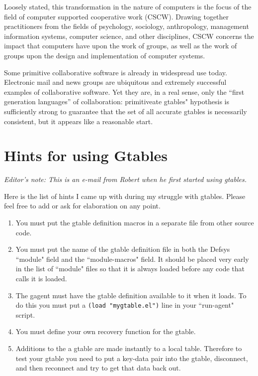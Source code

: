 Loosely stated, this transformation in the nature of computers is the focus
of the field of computer supported cooperative work (CSCW). Drawing
together practitioners from the fields of psychology, sociology,
anthropology, management information systems, computer science, and other
disciplines, CSCW concerns the impact that computers have upon the work of
groups, as well as the work of groups upon the design and implementation of
computer systems.  

Some primitive collaborative software is already in widespread use today.
Electronic mail and news groups are ubiquitous and extremely successful
examples of collaborative software.  Yet they are, in a real sense, only
the ``first generation languages'' of collaboration: primitiveate gtables" hypothesis is sufficiently
strong to guarantee that the set of all accurate gtables is
necessarily consistent, but it appears like a reasonable start. 

\newpage
\section{Hints for using Gtables}

{\em Editor's note: This is an e-mail from Robert when he first started
using gtables.}

Here is the list of hints I came up with during my struggle with gtables.
Please feel free to add or ask for elaboration on any point.


\begin{enumerate}
  
\item You must put the gtable definition macros in a separate file from
  other source code.

\item You must put the name of the gtable definition file in both the
  Defsys ``module" field and the ``module-macros" field. It should be
  placed very early in the list of ``module" files so that it is always
  loaded before any code that calls it is loaded.
  
\item The gagent must have the gtable definition available to it when it
  loads. To do this you must put a {\tt (load "mygtable.el")} line in your
  ``run-agent" script.

\item You must define your own recovery function for the gtable. 
  
\item Additions to the a gtable are made instantly to a local table.
  Therefore to test your gtable you need to put a key-data pair into the
  gtable, disconnect, and then reconnect and try to get that data back out.
\end{enumerate}




